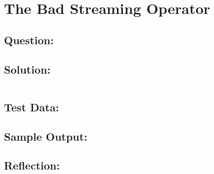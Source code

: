 \documentclass[Lab-B.tex]{subfiles}
\begin{document}
    \section{The Bad Streaming Operator}
        \subsection*{Question:}
            
        \subsection*{Solution:}
            \inputminted{cpp}{../02-Bad-Streaming/Bad-Streaming.cpp}%

        \subsection*{Test Data:}
        
        \subsection*{Sample Output:}

        \subsection*{Reflection:}
\end{document}
